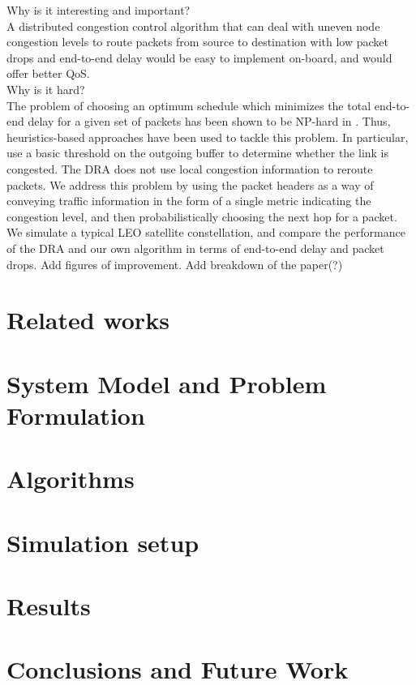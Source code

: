 \documentclass[10pt,conference, draft, letterpaper]{IEEEtran}
\newcommand{\rough}[1]{{\color{red} #1}}
\begin{document}
\rough{Why is it interesting and important?}\\
A distributed congestion control algorithm that can deal with uneven node congestion levels to route packets from source to destination with low packet drops and end-to-end delay would be easy to implement on-board, and would offer better QoS. \\
\rough{Why is it hard?}\\
The problem of choosing an optimum schedule which minimizes the total end-to-end delay for a given set of packets has been shown to be NP-hard in \cite{opt_schedule}. Thus, heuristics-based approaches have been used to tackle this problem. In particular, \cite{ekici-datagram}\cite{ekici-dist} use a basic threshold on the outgoing buffer to determine whether the link is congested. The DRA does not use local congestion information to reroute packets. We address this problem by using the packet headers as a way of conveying traffic information in the form of a single metric indicating the congestion level, and then probabilistically choosing the next hop for a packet. We simulate a typical LEO satellite constellation, and compare the performance of the DRA and our own algorithm in terms of end-to-end delay and packet drops. \rough{Add figures of improvement. Add breakdown of the paper(?)}
\section{Related works}
\section{System Model and Problem Formulation}
\section{Algorithms}
\section{Simulation setup}
\section{Results}
\section{Conclusions and Future Work}


\end{document}
